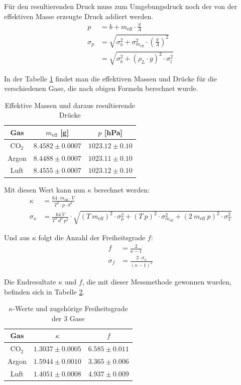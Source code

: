 \documentclass[12pt,a4paper,titlepage,headinclude,bibtotoc]{scrartcl}
\begin{document}
Für den resultierenden Druck muss zum Umgebungsdruck noch der von der effektiven Masse erzeugte Druck addiert werden.
\begin{align}
	p &= b + m_{\text{eff}} \cdot \frac{g}{A}\\
	\sigma_p &= \sqrt{\sigma_b^2+\sigma_{m_{\text{eff}}}^2 \cdot \left(\frac{g}{A}\right)^2}\\
	&=\sqrt{\sigma_b^2+\left(\rho_L \cdot g\right)^2 \cdot \sigma_l^2 }
\end{align}

In der Tabelle \ref{tab:RuechardtMasseDruck} findet man die effektiven Massen und Drücke für die verschiedenen Gase, die nach obigen Formeln berechnet wurde.
\begin{table}[!hbt]
	\centering
	\begin{tabular}{|c|c|c|}
		\hline
		Gas & $m_{\text{eff}}$ [g] & $p$ [hPa] \\
		\hline
		\hline
		CO$_2$ & $8.4582 \pm 0.0007$ & $1023.12 \pm 0.10$ \\
		Argon & $8.4488 \pm 0.0007$ & $1023.11 \pm 0.10$ \\
		Luft & $8.4555 \pm 0.0007$ & $1023.12 \pm 0.10$ \\
		\hline
	\end{tabular}
	\caption{Effektive Massen und daraus resultierende Drücke}
	\label{tab:RuechardtMasseDruck}
\end{table}

Mit diesen Wert kann nun $\kappa$ berechnet werden:
\begin{align}
	\kappa&=\frac{64 \cdot m_{\text{eff}}\cdot V }{T^{2} \cdot p \cdot d^{4}}\\
	\sigma_{\kappa}&=\frac{64 ~ V}{T^{3} ~ d^{4} ~ p^{2}} \cdot \sqrt{\left(T ~ m_{\text{eff}}\right)^2 \cdot \sigma_{p}^{2} + \left(T ~ p\right)^2 \cdot \sigma_{m_{\text{eff}}}^{2} + \left(2~m_{\text{eff}}~p\right)^{2} \cdot \sigma_{T}^{2}}
\end{align}

Und aus $\kappa$ folgt die Anzahl der Freiheitsgrade $f$:
\begin{align}
	f&=\frac{2}{\kappa - 1}\\
	\sigma_{f}&=\frac{2 \cdot \sigma_{\kappa}}{\left(\kappa - 1\right)^{2}}
\end{align}

Die Endresultate $\kappa$ und $f$, die mit dieser Messmethode gewonnen wurden, befinden sich in Tabelle \ref{tab:RuechardtKappaF}. 

\begin{table}[!hbt]
	\centering
	\begin{tabular}{|c|c|c|}
		\hline
		Gas & $\kappa$ & $f$\\
		\hline
		\hline		
		CO$_2$ & $1.3037 \pm 0.0005$ & $6.585 \pm 0.011$ \\
		Argon & $1.5944 \pm 0.0010$ & $3.365 \pm 0.006$ \\
		Luft & $1.4051 \pm 0.0008$ & $4.937 \pm 0.009$ \\		
		\hline
	\end{tabular}
	\caption{$\kappa$-Werte und zugehörige Freiheitsgrade der 3 Gase}
	\label{tab:RuechardtKappaF}
\end{table}
\end{document}
